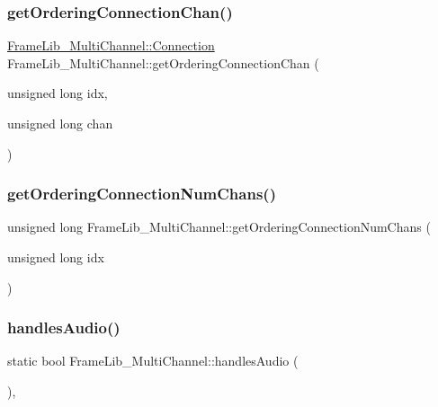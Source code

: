 \subsubsection{\texorpdfstring{get\+Ordering\+Connection\+Chan()}{getOrderingConnectionChan()}}
{\footnotesize\ttfamily \hyperlink{class_frame_lib___multi_channel_ae58a3f32378b88e31fd9da76206c7313}{Frame\+Lib\+\_\+\+Multi\+Channel\+::\+Connection} Frame\+Lib\+\_\+\+Multi\+Channel\+::get\+Ordering\+Connection\+Chan (\begin{DoxyParamCaption}\item[{unsigned long}]{idx,  }\item[{unsigned long}]{chan }\end{DoxyParamCaption})\hspace{0.3cm}{\ttfamily [protected]}}

\mbox{\label{class_frame_lib___multi_channel_a04fc2468a6e61cefa7579d0d470b2a6e}} 
\subsubsection{\texorpdfstring{get\+Ordering\+Connection\+Num\+Chans()}{getOrderingConnectionNumChans()}}
{\footnotesize\ttfamily unsigned long Frame\+Lib\+\_\+\+Multi\+Channel\+::get\+Ordering\+Connection\+Num\+Chans (\begin{DoxyParamCaption}\item[{unsigned long}]{idx }\end{DoxyParamCaption})\hspace{0.3cm}{\ttfamily [protected]}}

\mbox{\label{class_frame_lib___multi_channel_a2995ef0ba184b2d8a1c44b74f5f39876}} 
\subsubsection{\texorpdfstring{handles\+Audio()}{handlesAudio()}}
{\footnotesize\ttfamily static bool Frame\+Lib\+\_\+\+Multi\+Channel\+::handles\+Audio (\begin{DoxyParamCaption}{ }\end{DoxyParamCaption})\hspace{0.3cm}{\ttfamily [inline]}, {\ttfamily [static]}}

